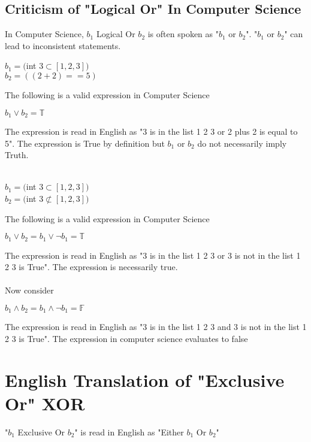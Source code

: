 \documentclass[11pt]{article}
\begin{document}
\subsection{Criticism of "Logical Or" In Computer Science}
In Computer Science, $b_1$ Logical Or $b_2$ is often spoken as "$b_1$ or $b_2$". "$b_1$ or $b_2$" can lead to inconsistent statements.\\
\begin{center}
$b_1 = ($int $3 \subset [1,2,3])$\\
\vspace{2mm}
$b_2 = ((2 + 2) == 5)$\\
\end{center}
\vspace{2mm}
The following is a valid expression in Computer Science
\begin{center}
$
b_1 \lor b_2 = \mathbb{T}
$
\end{center}
The expression is read in English as "3 is in the list 1 2 3 or 2 plus 2 is equal to 5". The expression is True by definition but $b_1$ or $b_2$
do not necessarily imply Truth.\\\\
\begin{center}
$b_1 = ($int $3 \subset [1,2,3])$\\
\vspace{2mm}
$b_2 = ($int $3 \not \subset [1,2,3])$\\
\end{center}
\vspace{2mm}
The following is a valid expression in Computer Science
\begin{center}
$
 b_1 \lor b_2 =  b_1 \lor \lnot b_1 = \mathbb{T}
$
\end{center}
The expression is read in English as "3 is in the list 1 2 3 or 3 is not in the list 1 2 3 is True". The expression is necessarily true.\\
\\Now consider
\begin{center}
$
 b_1 \land b_2 =  b_1 \land \lnot b_1 = \mathbb{F}
$
\end{center}
The expression is read in English as "3 is in the list 1 2 3 and 3 is not in the list 1 2 3 is True". The expression in computer science evaluates to false


\section{English Translation of "Exclusive Or" XOR}
"$b_1$ Exclusive Or $b_2$" is read in English as "Either $b_1$ Or $b_2$"
\end{document}
